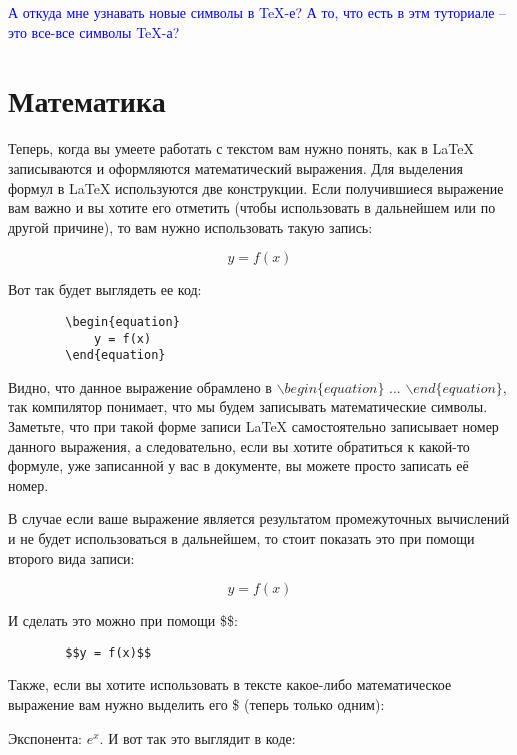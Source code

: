     \textcolor{Blue}{А откуда мне узнавать новые символы в TeX-е? А то, что есть в этм туториале -- это все-все символы TeX-а?}

    \section{Математика}

    Теперь, когда вы умеете работать с текстом вам нужно понять, как в \LaTeX{} записываются и оформляются математический выражения. Для выделения формул в \LaTeX{} используются две конструкции. Если получившиеся выражение вам важно и вы хотите его отметить (чтобы использовать в дальнейшем или по другой причине), то вам нужно использовать такую запись:

    \begin{equation}
        y = f(x)
    \end{equation}
    
    Вот так будет выглядеть ее код:    
    
    \begin{verbatim}
        \begin{equation}
            y = f(x)
        \end{equation}
    \end{verbatim}   
    
    Видно, что данное выражение обрамлено в $\backslash begin\{equation\}$ ... $\backslash end\{equation\}$, так компилятор понимает, что мы будем записывать математические символы. Заметьте, что при такой форме записи \LaTeX{} самостоятельно записывает номер данного выражения, а следовательно, если вы хотите обратиться к какой-то формуле, уже записанной у вас в документе, вы можете просто записать её номер.
    
    В случае если ваше выражение является результатом промежуточных вычислений и не будет использоваться в дальнейшем, то стоит показать это при помощи второго вида записи:
    
    $$y = f(x)$$    
    
    И сделать это можно при помощи \$\$:    
    
    \begin{verbatim}
        $$y = f(x)$$
    \end{verbatim}
    
    Также, если вы хотите использовать в тексте какое-либо математическое выражение вам нужно выделить его \$ (теперь только одним):

    Экспонента: $e^x$. И вот так это выглядит в коде:
    

